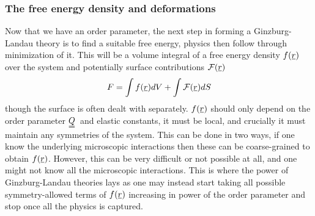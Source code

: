 \documentclass[12pt]{article}
\newcommand{\suf}[2]{\stackunder[0.5pt]{\stackunder[1pt]{\ensuremath{#1}}{\rule{\widthof{\ensuremath{#2}}*\real{0.9}}{.1ex}}}{}}
\newcommand{\duf}[2]{\stackunder[0.5pt]{\stackunder[0.8pt]{\stackunder[1pt]{\ensuremath{#1}}{\rule{\widthof{\ensuremath{#2}}*\real{0.9}}{.1ex}}}{\rule{\widthof{\ensuremath{#2}}*\real{0.9}}{.1ex}}}{}}
\newcommand{\su}[1]{\suf{#1}{#1}}
\newcommand{\du}[1]{\duf{#1}{#1}}
\newcommand{\QQ}{\ensuremath{\du{Q}}}
\begin{document}
        \subsubsection{The free energy density and deformations}
        Now that we have an order parameter, the next step in forming a Ginzburg-Landau theory is to find a suitable free energy, physics then follow through minimization of it.
        This will be a volume integral of a free energy density $f(\su{r})$ over the system and potentially surface contributions $\mathcal{F}(\su{r})$
        \begin{equation}
            F = \int f(\su{r}) dV + \int \mathcal{F}(\su{r}) dS
        \end{equation}
        though the surface is often dealt with separately.
        $f(\su{r})$ should only depend on the order parameter \QQ\ and elastic constants, it must be local, and crucially it must maintain any symmetries of the system\cite{kardarStatisticalPhysicsFields2007,reichlModernCourseStatistical2016}.
        This can be done in two ways, if one know the underlying microscopic interactions then these can be coarse-grained to obtain $f(\su{r})$.
        However, this can be very difficult or not possible at all, and one might not know all the microscopic interactions.
        This is where the power of Ginzburg-Landau theories lays as one may instead start taking all possible symmetry-allowed terms of $f(\su{r})$ increasing in power of the order parameter and stop once all the physics is captured.
\end{document}
